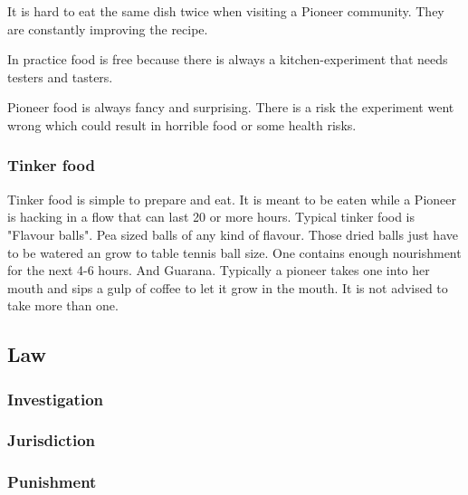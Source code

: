 It is hard to eat the same dish twice when visiting a Pioneer community. They are constantly improving the recipe.

In practice food is free because there is always a kitchen-experiment that needs testers and tasters.

Pioneer food is always fancy and surprising. There is a risk the experiment went wrong which could result in horrible food or some health risks.

\subsubsection{Tinker food}

Tinker food is simple to prepare and eat. It is meant to be eaten while a Pioneer is hacking in a flow that can last 20 or more hours. Typical tinker food is "Flavour balls". Pea sized balls of any kind of flavour. Those dried balls just have to be watered an grow to table tennis ball size. One contains enough nourishment for the next 4-6 hours. And Guarana.
Typically a pioneer takes one into her mouth and sips a gulp of coffee to let it grow in the mouth. It is not advised to take more than one.

\subsection{Law}
\label{sec: pioneer law}

\subsubsection{Investigation}


\subsubsection{Jurisdiction}


\subsubsection{Punishment}


